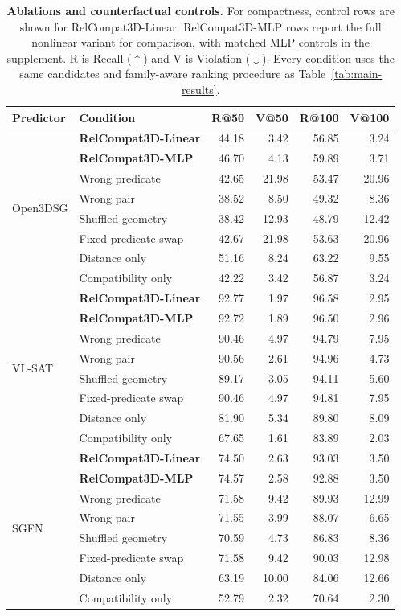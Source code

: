 \begin{table}[t]
    \centering
    {\small
    \setlength{\tabcolsep}{1.5pt}
    \begin{tabular}{@{}llrrrr@{}}
    \toprule
    Predictor & Condition & R@50 & V@50 & R@100 & V@100 \\
    \midrule
    \multirow{8}{*}{Open3DSG} & \textbf{RelCompat3D-Linear} & 44.18 & 3.42 & 56.85 & 3.24 \\
    & \textbf{RelCompat3D-MLP} & 46.70 & 4.13 & 59.89 & 3.71 \\
    & Wrong predicate & 42.65 & 21.98 & 53.47 & 20.96 \\
    & Wrong pair & 38.52 & 8.50 & 49.32 & 8.36 \\
    & Shuffled geometry & 38.42 & 12.93 & 48.79 & 12.42 \\
    & Fixed-predicate swap & 42.67 & 21.98 & 53.63 & 20.96 \\
    & Distance only & 51.16 & 8.24 & 63.22 & 9.55 \\
    & Compatibility only & 42.22 & 3.42 & 56.87 & 3.24 \\
    \midrule
    \multirow{8}{*}{VL-SAT} & \textbf{RelCompat3D-Linear} & 92.77 & 1.97 & 96.58 & 2.95 \\
    & \textbf{RelCompat3D-MLP} & 92.72 & 1.89 & 96.50 & 2.96 \\
    & Wrong predicate & 90.46 & 4.97 & 94.79 & 7.95 \\
    & Wrong pair & 90.56 & 2.61 & 94.96 & 4.73 \\
    & Shuffled geometry & 89.17 & 3.05 & 94.11 & 5.60 \\
    & Fixed-predicate swap & 90.46 & 4.97 & 94.81 & 7.95 \\
    & Distance only & 81.90 & 5.34 & 89.80 & 8.09 \\
    & Compatibility only & 67.65 & 1.61 & 83.89 & 2.03 \\
    \midrule
    \multirow{8}{*}{SGFN} & \textbf{RelCompat3D-Linear} & 74.50 & 2.63 & 93.03 & 3.50 \\
    & \textbf{RelCompat3D-MLP} & 74.57 & 2.58 & 92.88 & 3.50 \\
    & Wrong predicate & 71.58 & 9.42 & 89.93 & 12.99 \\
    & Wrong pair & 71.55 & 3.99 & 88.07 & 6.65 \\
    & Shuffled geometry & 70.59 & 4.73 & 86.83 & 8.36 \\
    & Fixed-predicate swap & 71.58 & 9.42 & 90.03 & 12.98 \\
    & Distance only & 63.19 & 10.00 & 84.06 & 12.66 \\
    & Compatibility only & 52.79 & 2.32 & 70.64 & 2.30 \\
    \bottomrule
    \end{tabular}
    }
    \caption{\textbf{Ablations and counterfactual controls.} For compactness, control rows are shown for RelCompat3D-Linear. RelCompat3D-MLP rows report the full nonlinear variant for comparison, with matched MLP controls in the supplement. R is Recall ($\uparrow$) and V is Violation ($\downarrow$). Every condition uses the same candidates and family-aware ranking procedure as Table~\ref{tab:main-results}.}
    \label{tab:ablations}
\end{table}

